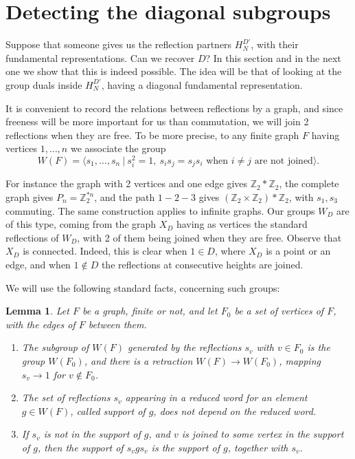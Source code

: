 \documentclass[11pt,a4paper]{article}
\newtheorem{lem}[thm]{Lemma}
\begin{document}
\section{Detecting the diagonal subgroups}\label{detection}

Suppose that someone gives us the reflection partners $H_N^{D'}$, with their fundamental representations. Can we recover $D$? In this section and in the next one we show that this is indeed possible. The idea will be that of looking at the group duals inside $H_N^{D'}$, having a diagonal fundamental representation.

It is convenient to record the relations between reflections by a graph, and since freeness will be more important for us than commutation, we will join 2 reflections when they are free. To be more precise, to any finite graph $F$ having vertices $1,\ldots,n$ we associate the group
\[
 W(F)=\Big\langle s_1,\ldots,s_n\ \Big|\ s_i^2=1,\ s_is_j=s_js_i\text{ when }i\neq j\text{ are not joined}\Big\rangle.
\]

For instance the graph with 2 vertices and one edge gives $\mathbb Z_2*\mathbb Z_2$, the complete graph gives $P_n=\mathbb Z_2^{*n}$, and the path $1-2-3$ gives $(\mathbb Z_2\times\mathbb Z_2)*\mathbb Z_2$, with $s_1,s_3$ commuting. The same construction applies to infinite graphs. Our groups $W_D$ are of this type, coming from the graph $X_D$ having as vertices the standard reflections of $W_D$, with 2 of them being joined when they are free. Observe that $X_D$ is connected. Indeed, this is clear when $1\in D$, where $X_D$ is a point or an edge, and when $1\notin D$ the reflections at consecutive heights are joined.

We will use the following standard facts, concerning such groups:

\begin{lem}\label{retraction}
Let $F$ be a graph, finite or not, and let $F_0$ be a set of vertices of $F$, with the edges of $F$ between them.
\begin{enumerate}
\item The subgroup of $W(F)$ generated by the reflections $s_v$ with $v\in F_0$ is the group $W(F_0)$, and there is a retraction $W(F)\to W(F_0)$, mapping $s_v\to1$ for $v\notin F_0$.

\item The set of reflections $s_v$ appearing in a reduced word for an element $g\in W(F)$, called support of $g$, does not depend on the reduced word.

\item If $s_v$ is not in the support of $g$, and $v$ is joined to some vertex in the support of $g$, then the support of $s_vgs_v$ is the support of $g$, together with $s_v$.
\end{enumerate}
\end{lem}
\end{document}
